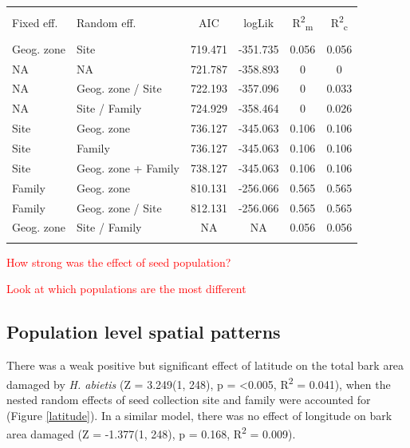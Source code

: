 \documentclass[a4paper, 11pt]{article}
\newcommand{\todo}[1]{\textcolor{red}{#1}}   %
\begin{document}
\begin{table}[!htbp] 
  \caption{} 
  \label{} 
\centering
\begin{tabular}{@{\extracolsep{5pt}} llS[table-format=3.2]S[table-format=3.2]S[table-format=3.2]S[table-format=3.2]} 
\\[-1.8ex]\hline 
\hline \\[-1.8ex] 
Fixed eff. & Random eff. & {AIC} & {logLik} & {R\textsuperscript{2}\textsubscript{m}} & {R\textsuperscript{2}\textsubscript{c}} \\ 
\hline \\[-1.8ex] 
Geog. zone & Site & 719.471 & -351.735 & 0.056 & 0.056 \\ 
NA & NA & 721.787 & -358.893 & 0 & 0 \\ 
NA & Geog. zone / Site & 722.193 & -357.096 & 0 & 0.033 \\ 
NA & Site / Family & 724.929 & -358.464 & 0 & 0.026 \\ 
Site & Geog. zone & 736.127 & -345.063 & 0.106 & 0.106 \\ 
Site & Family & 736.127 & -345.063 & 0.106 & 0.106 \\ 
Site & Geog. zone + Family & 738.127 & -345.063 & 0.106 & 0.106 \\ 
Family & Geog. zone & 810.131 & -256.066 & 0.565 & 0.565 \\ 
Family & Geog. zone / Site & 812.131 & -256.066 & 0.565 & 0.565 \\ 
Geog. zone & Site / Family & {NA} & {NA} & 0.056 & 0.056 \\ 
\hline \\[-1.8ex] 
\end{tabular} 
\end{table} 

\todo{How strong was the effect of seed population?}

\todo{Look at which populations are the most different}

\subsection*{Population level spatial patterns}

There was a weak positive but significant effect of latitude on the total bark area damaged by \textit{H. abietis} (Z = 3.249(1, 248), p =  \textless{}0.005, R\textsuperscript{2} = 0.041), when the nested random effects of seed collection site and family were accounted for (Figure \ref{latitude}). In a similar model, there was no effect of longitude on bark area damaged (Z = -1.377(1, 248), p = 0.168, R\textsuperscript{2} = 0.009).  
\end{document}
